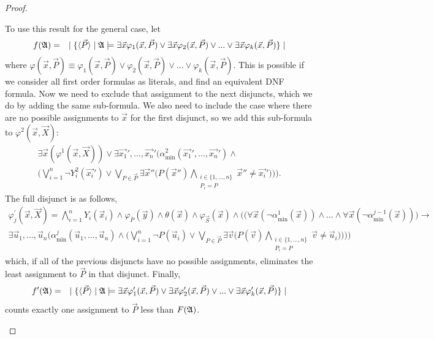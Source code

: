 \documentclass[12pt]{article}
\def\A{{\frak A}}
\def\P{\vec{P}}
\def\S{\vec{S}}
\def\X{\vec{X}}
\def\d{\vec{d}}
\def\u{\vec{u}}
\def\v{\vec{v}}
\def\x{\vec{x}}
\begin{document}
\begin{proof}
\begin{enumerate}




To use this result for the general case, let
\begin{eqnarray*}
f(\A) &=& \mid \{ \langle\P\rangle \mid \A \models 
\exists \x \varphi_1(\x,\P) \vee
\exists \x \varphi_2(\x,\P) \vee
... \vee
\exists \x \varphi_k(\x,\P)
 \} \mid
\end{eqnarray*}
where $\varphi(\x,\P) \equiv \varphi_1(\x,\P) \vee \varphi_2(\x,\P) \vee ...  \vee \varphi_k(\x,\P) $. This is possible if we consider all first order formulas as literals, and find an equivalent DNF formula. Now we need to exclude that assignment to the next disjuncts, which we do by adding the same sub-formula. We also need to include the case where there are no possible assignments to $\x$ for the first disjunct, so we add this sub-formula to $\varphi^2(\x,\X)$:
\begin{multline*}
\exists\x\left(\varphi^1(\x,\X)\right) \vee \exists\vec{x_1}',...,\vec{x_n}'\Bigg(\alpha^2_{\min}(\vec{x_1}',...,\vec{x_n}') \wedge \\
\bigg(\bigvee_{i = 1}^{n}\neg Y^2_i(\vec{x_i}') \vee \bigvee_{P\in\P} \exists \x''\Big( P(\x'') \bigwedge_{\substack{i\in\{1,...,n\} \\ P_i = P}} \x'' \neq \vec{x_i}'\Big) \bigg) \Bigg).
\end{multline*}
The full disjunct is as follows,
\begin{multline*}
\varphi_j^\prime(\x,\X) = \bigwedge_{i=1}^n Y_i(\x_i) \wedge \varphi_{\overline{P}}(\vec{y}) \wedge \theta(\x) \wedge \varphi_{\S}(\x) \wedge \Bigg(\Big(\forall\x\left(\neg\alpha^1_{\min}(\x)\right)\wedge ... \wedge \forall\x\left(\neg\alpha^{j-1}_{\min}(\x)\right)\Big) \to \\ 
\exists\u_1,...,\u_n\Bigg(\alpha^j_{\min}(\u_1,...,\u_n) \wedge
\bigg(\bigvee_{i = 1}^n\neg P(\u_i) \vee \bigvee_{P\in\P} \exists \v\Big( P(\v) \bigwedge_{\substack{i\in\{1,...,n\} \\ P_i = P}} \v \neq \u_i\Big) \bigg) \Bigg) \Bigg)
\end{multline*}
which, if all of the previous disjuncts have no possible assignments, eliminates the least assignment to $\P$ in that disjunct. Finally,
\begin{eqnarray*}
f^\prime(\A) &=& \mid \{ \langle\P\rangle \mid \A \models 
\exists \x \varphi^\prime_1(\x,\P) \vee
\exists \x \varphi^\prime_2(\x,\P) \vee
... \vee
\exists \x \varphi^\prime_k(\x,\P)
 \} \mid
\end{eqnarray*}
counts exactly one assignment to $\P$ less than $F(\A)$.


\end{enumerate}
\end{proof}
\end{document}
